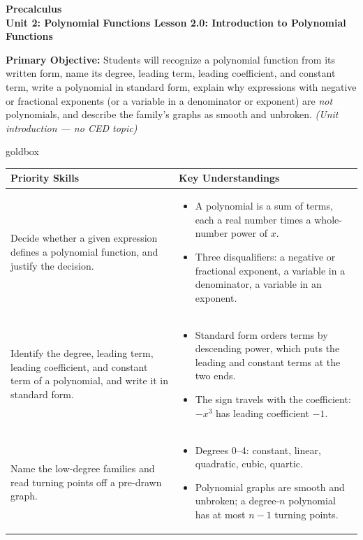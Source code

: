 \documentclass[10pt]{article}
\newcommand{\CourseName}{Precalculus}
\newcommand{\UnitNumberName}{Unit 2: Polynomial Functions \quad}
\newcommand{\LessonNumberName}{Lesson 2.0: Introduction to Polynomial Functions}
\begin{document}
\begin{center}
    {\Large\bfseries \CourseName \\
    {\small\bfseries \UnitNumberName \LessonNumberName}}
\end{center}

\begin{tcolorbox}[colback=lilac, colframe=plum, boxrule=0.9pt, arc=2mm,
    left=2mm, right=2mm, top=1.5mm, bottom=1.5mm]
    \textbf{Primary Objective:} Students will recognize a polynomial function from
    its written form, name its degree, leading term, leading coefficient, and
    constant term, write a polynomial in standard form, explain why expressions
    with negative or fractional exponents (or a variable in a denominator or
    exponent) are \textit{not} polynomials, and describe the family's graphs as
    smooth and unbroken.
    \hfill\textit{\small (Unit introduction --- no CED topic)}
\end{tcolorbox}

\renewcommand{\arraystretch}{1.6}
\begin{skillbox}{goldbox}
\begin{tabularx}{\linewidth}{@{}X X@{}}
\textbf{Priority Skills} &
\textbf{Key Understandings} \\
\midrule
Decide whether a given expression defines a polynomial function, and justify the
decision. &
\begin{itemize}[leftmargin=1.2em,itemsep=2pt,topsep=0pt]
  \item A polynomial is a sum of terms, each a real number times a whole-number
        power of $x$.
  \item Three disqualifiers: a negative or fractional exponent, a variable in a
        denominator, a variable in an exponent.
\end{itemize} \\
Identify the degree, leading term, leading coefficient, and constant term of a
polynomial, and write it in standard form. &
\begin{itemize}[leftmargin=1.2em,itemsep=2pt,topsep=0pt]
  \item Standard form orders terms by descending power, which puts the leading
        and constant terms at the two ends.
  \item The sign travels with the coefficient: $-x^3$ has leading coefficient
        $-1$.
\end{itemize} \\
Name the low-degree families and read turning points off a pre-drawn graph. &
\begin{itemize}[leftmargin=1.2em,itemsep=2pt,topsep=0pt]
  \item Degrees 0--4: constant, linear, quadratic, cubic, quartic.
  \item Polynomial graphs are smooth and unbroken; a degree-$n$ polynomial has at
        most $n-1$ turning points.
\end{itemize} \\
\end{tabularx}
\end{skillbox}
\end{document}
